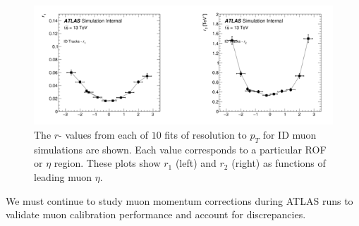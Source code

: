 \begin{figure}[!h]
	\centering 
    \includegraphics[width=.85\textwidth]{Pictures/parametrizationIDeta.PNG}
    \caption{ The $r$- values from each of $10$ fits of resolution to $p_T$ for ID muon simulations are shown. Each value corresponds to a particular ROF or $\eta$ region. These plots show $r_1$ (left) and $r_2$  (right) as functions of leading muon $\eta$.}
    \label{fig:parametrizationeta}
\end{figure}

\par \hspace{20 pt}
We must continue to study muon momentum corrections during ATLAS runs to validate muon calibration performance and account for discrepancies.
